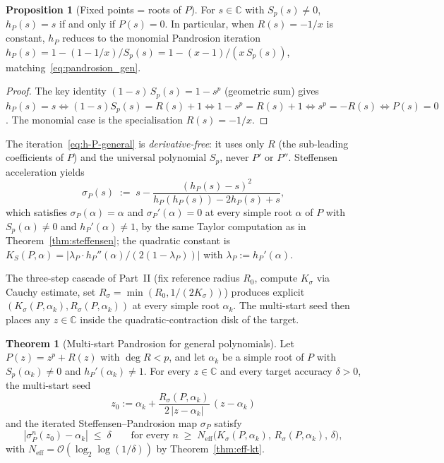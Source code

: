 \documentclass[11pt,a4paper]{article}
\theoremstyle{definition}
\newtheorem{theorem}{Theorem}[section]
\newtheorem{proposition}{Proposition}[section]
\begin{document}
\begin{proposition}[Fixed points = roots of $P$]\label{prop:hP-fixed-points}
For $s \in \mathbb{C}$ with $S_p(s) \neq 0$, $h_P(s) = s$ if and only if $P(s) = 0$. In particular, when $R(s) = -1/x$ is constant, $h_P$ reduces to the monomial Pandrosion iteration $h_P(s) = 1 - (1 - 1/x)/S_p(s) = 1 - (x-1)/(x\,S_p(s))$, matching~\eqref{eq:pandrosion_gen}.
\end{proposition}

\begin{proof}
The key identity $(1 - s)\,S_p(s) = 1 - s^p$ (geometric sum) gives $h_P(s) = s \iff (1-s)S_p(s) = R(s)+1 \iff 1 - s^p = R(s)+1 \iff s^p = -R(s) \iff P(s) = 0$. The monomial case is the specialisation $R(s) = -1/x$.
\end{proof}

The iteration~\eqref{eq:h-P-general} is \emph{derivative-free}: it uses only $R$ (the sub-leading coefficients of $P$) and the universal polynomial $S_p$, never $P'$ or $P''$. Steffensen acceleration yields
\[
  \sigma_P(s) \;:=\; s - \frac{(h_P(s) - s)^2}{h_P(h_P(s)) - 2h_P(s) + s},
\]
which satisfies $\sigma_P(\alpha) = \alpha$ and $\sigma_P'(\alpha) = 0$ at every simple root $\alpha$ of $P$ with $S_p(\alpha) \neq 0$ and $h_P'(\alpha) \neq 1$, by the same Taylor computation as in Theorem~\ref{thm:steffensen}; the quadratic constant is $K_S(P, \alpha) = |\lambda_P \cdot h_P''(\alpha)/(2(1 - \lambda_P))|$ with $\lambda_P := h_P'(\alpha)$.

The three-step cascade of Part~II (fix reference radius $R_0$, compute $K_\sigma$ via Cauchy estimate, set $R_\sigma = \min(R_0, 1/(2K_\sigma))$) produces explicit $(K_\sigma(P, \alpha_k), R_\sigma(P, \alpha_k))$ at every simple root $\alpha_k$. The multi-start seed then places any $z \in \mathbb{C}$ inside the quadratic-contraction disk of the target.

\begin{theorem}[Multi-start Pandrosion for general polynomials]\label{thm:multistart-general}
Let $P(z) = z^p + R(z)$ with $\deg R < p$, and let $\alpha_k$ be a simple root of $P$ with $S_p(\alpha_k) \neq 0$ and $h_P'(\alpha_k) \neq 1$. For every $z \in \mathbb{C}$ and every target accuracy $\delta > 0$, the multi-start seed
\[
  z_0 := \alpha_k + \frac{R_\sigma(P, \alpha_k)}{2\,|z - \alpha_k|}\,(z - \alpha_k)
\]
and the iterated Steffensen--Pandrosion map $\sigma_P$ satisfy
\[
  |\sigma_P^n(z_0) - \alpha_k| \;\leq\; \delta
  \qquad \text{for every } n \;\geq\; N_{\mathrm{eff}}\bigl(K_\sigma(P, \alpha_k),\, R_\sigma(P, \alpha_k),\, \delta\bigr),
\]
with $N_{\mathrm{eff}} = \mathcal{O}(\log_2 \log(1/\delta))$ by Theorem~\ref{thm:eff-kt}.
\end{theorem}
\end{document}
